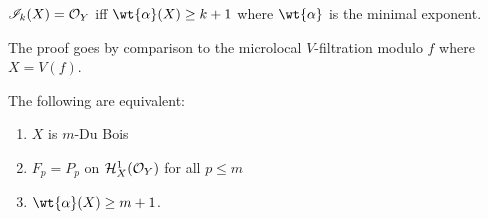 \documentclass[12pt]{article}
\renewcommand{\cH}{\mathcal{H}}
\begin{document}
\begin{theorem}[Saito]
$\mathscr{I}_k(X) = \mathcal{O}_{Y}$ iff $\wt{\alpha}(X) \ge k+1$ where $\wt{\alpha}$ is the minimal exponent. 
\end{theorem}

The proof goes by comparison to the microlocal $V$-filtration modulo $f$ where $X = V(f)$. 

\begin{theorem}
The following are equivalent:
\begin{enumerate}
\item $X$ is $m$-Du Bois
\item $F_p = P_p$ on $\cH^1_X(\struct{Y})$ for all $p \le m$
\item $\wt{\alpha}(X) \ge m + 1$.
\end{enumerate}
\end{theorem}
\end{document}
